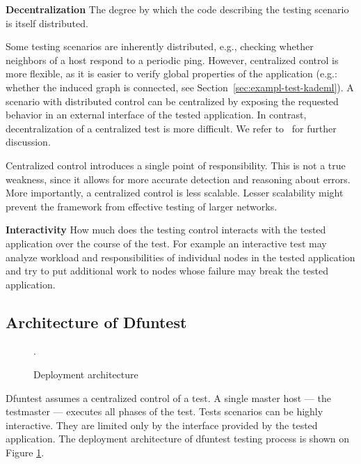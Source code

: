 \begin{description}
  \item{\textbf{Decentralization}} The degree by which the code describing the testing scenario is itself distributed.

    Some testing scenarios are inherently distributed, e.g., checking whether
    neighbors of a host respond to a periodic ping.  However, centralized
    control is more flexible, as it is easier to verify global properties of the
    application (e.g.: whether the induced graph is connected, see
    Section~\ref{sec:exampl-test-kademl}).  A scenario with distributed control
    can be centralized by exposing the requested behavior in an external
    interface of the tested application. In contrast, decentralization of a centralized
    test is more difficult.
    We refer to~\cite{ulr99,hie08,hie12} for further discussion.

    Centralized control introduces a single point of responsibility.
    This is not a true weakness, since it allows for more accurate detection and reasoning about errors.
    More importantly, a centralized control is less scalable.
    Lesser scalability might prevent the framework from effective testing of larger networks.

  \item{\textbf{Interactivity}} How much does the testing control interacts with
    the tested application over the course of the test.
    For example an interactive test may analyze workload and responsibilities of
    individual nodes in the tested application and try to put additional work to
    nodes whose failure may break the tested application.
\end{description}


\subsection{Architecture of Dfuntest}

\begin{figure}[tbp]
  \centering
  \def\svgwidth{\columnwidth}
  \scriptsize {
  
}
\caption{Deployment architecture}
\label{fig:4_deployment_architecture}.
\end{figure}

Dfuntest assumes a centralized control of a test. A single master
host --- the testmaster --- executes all phases of the test.
Tests scenarios can be highly interactive.
They are limited only by the interface provided by the tested application.
The deployment architecture of dfuntest testing process is shown on Figure \ref{fig:4_deployment_architecture}.

